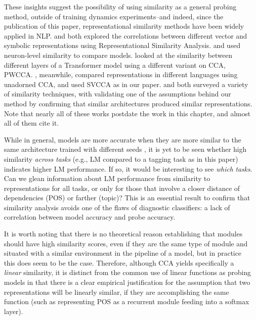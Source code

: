 These insights suggest the possibility of using similarity as a general probing method, outside of training dynamics experiments--and indeed, since the publication of this paper, representational similarity methods have been widely applied in NLP. \citet{chrupala_correlating_2019} and \citet{chrupala_symbolic_2019} both explored the correlations between different vector and symbolic representations using Representational Similarity Analysis. \citet{movva_dissecting_2020} and \citet{bau_identifying_2018} used neuron-level similarity to compare models. \citet{voita_bottom-up_2019} looked at the similarity between different layers of a Transformer model using a different variant on CCA, PWCCA. \citet{singh_bert_2019}, meanwhile, compared representations in different languages using unadorned CCA, and \citet{hsu_zero_2019} used SVCCA as in our paper. \citet{chung_similarity_2020} and \citet{wu_similarity_2020} both surveyed a variety of similarity techniques, with \citet{wu_similarity_2020} validating one of the assumptions behind our method by confirming that similar architectures produced similar representations. Note that nearly all of these works postdate the work in this chapter, and almost all of them cite it.

While in general, models are more accurate when they are more similar to the same architecture trained with different seeds \citep{raghu_svcca:_2017}, it is yet to be seen whether high similarity \textit{across tasks} (e.g., LM compared to a tagging task as in this paper) indicates higher LM performance. If so, it would be interesting to see \textit{which tasks}. Can we glean information about LM performance from similarity to representations for all tasks, or only for those that involve a closer distance of dependencies (POS) or farther (topic)? This is an essential result to confirm that similarity analysis avoids one of the flaws of diagnostic classifiers: a lack of correlation between model accuracy and probe accuracy.

It is worth noting that there is no theoretical reason establishing that modules should have high similarity scores, even if they are the same type of module and situated with a similar environment in the pipeline of a model, but in practice \citep{chung_similarity_2020,raghu_svcca:_2017,morcos_insights_2018} this does seem to be the case. Therefore, although CCA yields specifically a \textit{linear} similarity, it is distinct from the common use of linear functions as probing models in that there is a clear empirical justification for the assumption that two representations  will be linearly similar, if they are accomplishing the same function (such as  representing POS as a recurrent module feeding into a softmax layer).

